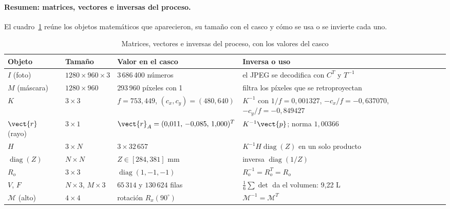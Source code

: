 \paragraph{Resumen: matrices, vectores e inversas del proceso.} El cuadro~\ref{tab:resumen-algebra} reúne los objetos
matemáticos que aparecieron, su tamaño con el casco y cómo se usa o se invierte cada uno.

\begin{table}[htbp]
\caption{Matrices, vectores e inversas del proceso, con los valores del casco}
\label{tab:resumen-algebra}
\centering\small
\begin{tabular}{@{}p{2.3cm}p{3.0cm}p{4.2cm}p{4.0cm}@{}}
\toprule
Objeto & Tamaño & Valor en el casco & Inversa o uso \\
\midrule
$I$ (foto) & $1280\times960\times3$ & 3\,686\,400 números & el JPEG se decodifica con $C^{T}$ y $T^{-1}$ \\
$M$ (máscara) & $1280\times960$ & 293\,960 píxeles con 1 & filtra los píxeles que se retroproyectan \\
$K$ & $3\times3$ & $f=753{,}449$, $(c_x,c_y)=(480,640)$ & $K^{-1}$ con $1/f=0{,}001327$, $-c_x/f=-0{,}637070$, $-c_y/f=-0{,}849427$ \\
$\vect{r}$ (rayo) & $3\times1$ & $\vect{r}_A=(0{,}011,\,-0{,}085,\,1{,}000)^{T}$ & $K^{-1}\vect{p}$; norma $1{,}00366$ \\
$H$ & $3\times N$ & $3\times32\,657$ & $K^{-1}H\operatorname{diag}(Z)$ en un solo producto \\
$\operatorname{diag}(Z)$ & $N\times N$ & $Z\in[284,381]$ mm & inversa $\operatorname{diag}(1/Z)$ \\
$R_o$ & $3\times3$ & $\operatorname{diag}(1,-1,-1)$ & $R_o^{-1}=R_o^{T}=R_o$ \\
$V$, $F$ & $N\times3$, $M\times3$ & $65\,314$ y $130\,624$ filas & $\tfrac16\sum\det$ da el volumen: 9{,}22 L \\
$\mathcal{M}$ (alto) & $4\times4$ & rotación $R_x(90^\circ)$ & $\mathcal{M}^{-1}=\mathcal{M}^{T}$ \\
\bottomrule
\end{tabular}
\end{table}
